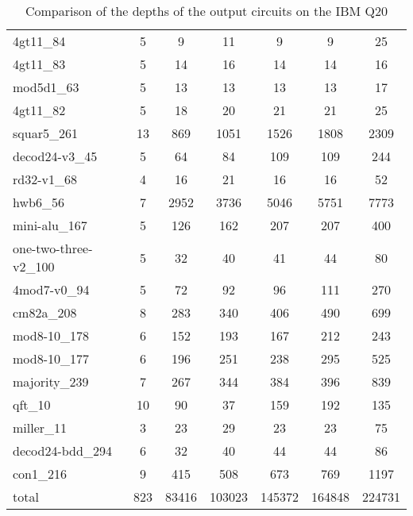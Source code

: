 \documentclass[journal]{IEEEtran}
\begin{document}
\begin{table*}[htbp]
\begin{center}
\begin{tabular}{|p{4.3cm}<{\centering}|c|c|c|c|c|c|}
                        4gt11\_84 & 5 & 9 & 11 & 9 & 9 & 25 \\
                        4gt11\_83 & 5 & 14 & 16 & 14 & 14 & 16 \\
                        mod5d1\_63 & 5 & 13 & 13 & 13 & 13 & 17 \\
                        4gt11\_82 & 5 & 18 & 20 & 21 & 21 & 25 \\
                        squar5\_261 & 13 & 869 & 1051 & 1526 & 1808 & 2309 \\
                        decod24-v3\_45 & 5 & 64 & 84 & 109 & 109 & 244 \\
                        rd32-v1\_68 & 4 & 16 & 21 & 16 & 16 & 52 \\
                        hwb6\_56 & 7 & 2952 & 3736 & 5046 & 5751 & 7773 \\
                        mini-alu\_167 & 5 & 126 & 162 & 207 & 207 & 400 \\
                        one-two-three-v2\_100 & 5 & 32 & 40 & 41 & 44 & 80 \\
                        4mod7-v0\_94 & 5 & 72 & 92 & 96 & 111 & 270 \\
                        cm82a\_208 & 8 & 283 & 340 & 406 & 490 & 699 \\
                        mod8-10\_178 & 6 & 152 & 193 & 167 & 212 & 243 \\
                        mod8-10\_177 & 6 & 196 & 251 & 238 & 295 & 525 \\
                        majority\_239 & 7 & 267 & 344 & 384 & 396 & 839 \\
                        qft\_10 & 10 & 90 & 37 & 159 & 192 & 135 \\
                        miller\_11 & 3 & 23 & 29 & 23 & 23 & 75 \\
                        decod24-bdd\_294 & 6 & 32 & 40 & 44 & 44 & 86 \\
                        con1\_216 & 9 & 415 & 508 & 673 & 769 & 1197 \\
                        \hline
                        total & 823 & 83416 & 103023 & 145372 & 164848 & 224731  \\
                        \hline
                            \end{tabular} 
                            \end{center} 
                            \caption{Comparison of  the depths of the output circuits on the IBM Q20} 
                            \label{tab6}	
\end{table*}
                        
\end{document}
